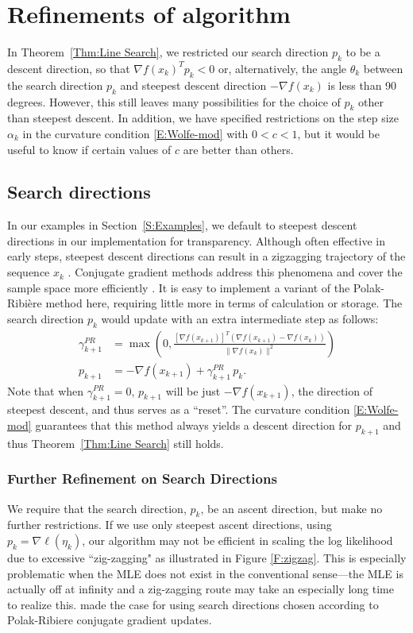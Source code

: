 \chapter{Refinements of algorithm}

In Theorem~\ref{Thm:Line Search}, we restricted our search direction $p_k$ to be a 
descent direction, so that $\nabla f
(x_k)^T p_k < 0$ or, alternatively, the angle $\theta_k$ between the search direction 
$p_k$ and steepest descent 
direction $-\nabla f(x_k)$ is less than 90 degrees.  However, this still leaves many 
possibilities for the choice of 
$p_k$ other than steepest descent.  In addition, we have specified restrictions on the 
step size $\alpha_k$ in the 
curvature condition \eqref{E:Wolfe-mod} with $0 < c < 1$, but it would be useful to 
know if certain values of $c$ are 
better than others.

\section{Search directions}
In our examples in Section~\ref{S:Examples}, we default to steepest descent directions 
in our implementation for 
transparency.  Although often effective in early steps, steepest descent directions 
can result in a zigzagging 
trajectory of the sequence $x_k$ \citep{Sun:2006}.  Conjugate gradient methods address 
this phenomena and cover the 
sample space more efficiently \citep{NW}.  It is easy to implement a variant of the 
Polak-Ribi\`{e}re method
\citep[pp.~120--122]{NW} here, requiring little more in terms of calculation or 
storage.  The search direction $p_k$ would update 
with an extra intermediate step as follows:
\begin{align*}
	\gamma_{k+1}^{PR} &= \max \left( 0, \frac{ [ \nabla f( x_{k+1}) ]^T( \nabla f( x_{k+1} ) - \nabla f( x_k) )  }
{ \lVert \nabla f( x_k) \rVert^2 } \right )\\
	p_{k+1} &= -\nabla f( x_{k+1}) + \gamma_{k+1}^{PR} \, p_k.
\end{align*}
Note that when $\gamma_{k+1}^{PR} = 0$, $p_{k+1}$ will be just $-\nabla f( x_{k+1})$, 
the direction of steepest 
descent, and thus serves as a ``reset''.  The curvature condition \eqref{E:Wolfe-mod} 
guarantees that this method always 
yields a descent direction for $p_{k+1}$ and thus Theorem~\ref{Thm:Line Search} still 
holds.  


\subsection{Further Refinement on Search Directions}
We require that the search direction, $p_k$, be an ascent direction, but make no 
further restrictions.
If we use only steepest ascent directions, using $p_k = \nabla \ell( \eta_k)$, our 
algorithm 
may not be efficient in scaling the log likelihood due to excessive ``zig-zagging" as 
illustrated in Figure 
\ref{F:zigzag}.  This is especially problematic when the MLE does not exist in the 
conventional sense---the MLE is actually off at infinity and a zig-zagging route may 
take an especially long time to realize this.  \citet{Okabayashi:longrange} made the 
case for using search directions chosen according to Polak-Ribiere conjugate gradient 
updates.  

